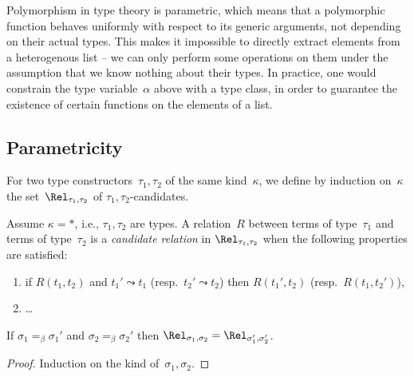 
Polymorphism in type theory is parametric, which means that a
polymorphic function behaves uniformly with respect to its generic
arguments, not depending on their actual types. This makes it
impossible to directly extract elements from a heterogenous list -- we
can only perform some operations on them under the assumption that we
know nothing about their types. In practice, one would constrain the
type variable~$\alpha$ above with a type class, in order to guarantee
the existence of certain functions on the elements of a list.


\subsection{Parametricity}

\begin{definition}\label{def_param_candidate}\normalfont
  For two type constructors~$\tau_1,\tau_2$ of the same kind~$\kappa$,
  we define by induction on~$\kappa$ the set~$\Rel_{\tau_1,\tau_2}$ of
  $\tau_1,\tau_2$-candidates.

  Assume $\kappa=*$, i.e., $\tau_1,\tau_2$ are types. A relation~$R$
  between terms of type~$\tau_1$ and terms of type~$\tau_2$ is a
  \emph{candidate relation} in $\Rel_{\tau_1,\tau_2}$ when the
  following properties are satisfied:
  \begin{enumerate}
  \item if $R(t_1,t_2)$ and $t_1' \leadsto t_1$ (resp.~$t_2' \leadsto
    t_2$) then $R(t_1',t_2)$ (resp.~$R(t_1,t_2')$),
  \item \ldots
  \end{enumerate}
\end{definition}

\begin{lemma}\label{lem_beta_param_candidate}
  If $\sigma_1 =_\beta \sigma_1'$ and $\sigma_2 =_\beta \sigma_2'$
  then $\Rel_{\sigma_1,\sigma_2} = \Rel_{\sigma_1',\sigma_2'}$.
\end{lemma}

\begin{proof}
  Induction on the kind of~$\sigma_1,\sigma_2$.
\end{proof}


